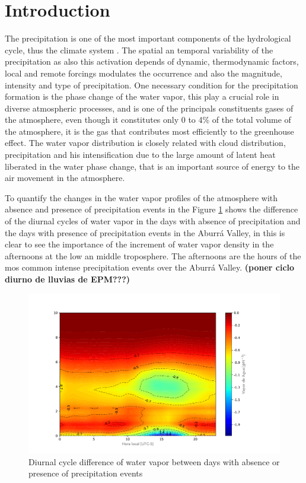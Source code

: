 \documentclass[	DIV=calc,%
							paper=a4,%
							fontsize=11pt,%
							twocolumn]{scrartcl}	 					%
\begin{document}
\section{Introduction}
The precipitation is one of the most important components of the hydrological cycle, thus the climate system \citep{davies2011global}. The spatial an temporal variability of the precipitation as also this activation depends of dynamic, thermodynamic factors, local and remote forcings modulates the occurrence and also the magnitude, intensity and type of precipitation. One necessary condition for the precipitation formation is the phase change of the water vapor, this play a crucial role in diverse atmospheric processes, and is one of the principals constituents gases of the atmosphere, even though it constitutes only 0 to 4\% of the total volume of the atmosphere, it is the gas that contributes most efficiently to the greenhouse effect. The water vapor distribution is closely related with cloud distribution, precipitation and his intensification due to the large amount of latent heat liberated in the water phase change, that is an important source of energy to the air movement in the atmosphere.


To quantify the changes in the water vapor profiles of the atmosphere with absence and presence of precipitation events in the Figure \ref{fig:VaporDifference} shows the difference of the diurnal cycles of water vapor in the days with absence of precipitation and the days with presence of precipitation events in the Aburr\'a Valley, in this is clear to see the importance of the increment of water vapor density in the afternoons at the low an middle troposphere. The afternoons are the  hours of the mos common intense precipitation events over the Aburr\'a Valley. \textbf{ (poner ciclo diurno de lluvias de EPM???)}

\begin{figure}[h!]
\centering
\includegraphics[width=1.2\linewidth]{Figuras/V_C_Matrix_resta.pdf}
\caption{Diurnal cycle difference of water vapor between days with absence or presence of precipitation events }
\label{fig:VaporDifference}
\end{figure}
\end{document}
